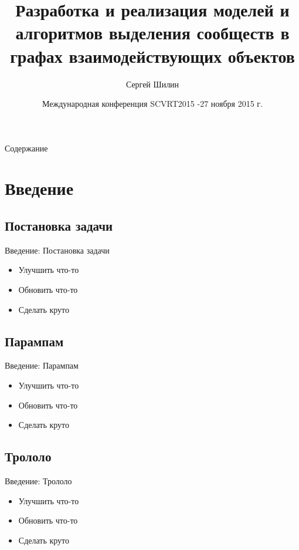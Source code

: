 \documentclass[11pt,pdf,hyperref={unicode}]{beamer}
\title[Выделение сообществ в графах \hspace*{1cm} SCVRT2015]{Разработка и реализация моделей и алгоритмов выделения сообществ в графах взаимодействующих объектов}
\author[C. Шилин]{Сергей Шилин \vspace{-0.7cm}}
\date[SCVRT2015]{Международная конференция SCVRT2015 \break 24-27 ноября 2015 г. }
\begin{document}
\frame{\titlepage}
\begin{frame}{Содержание}
	\tableofcontents
\end{frame}

\section{Введение} %
\label{sec:intro}

	\subsection{Постановка задачи} %
	\label{sub:problem}
		\begin{frame}{Введение: Постановка задачи} 
			\begin{itemize}
				\item Улучшить что-то
				\pause \item Обновить что-то
				\pause \item Сделать круто
			\end{itemize}
		\end{frame}

	\subsection{Парампам} %
	\label{sub:params}
		\begin{frame}{Введение: Парампам}
			\begin{itemize}
				\item Улучшить что-то
				\pause \item Обновить что-то
				\pause \item Сделать круто
			\end{itemize}
		\end{frame}
	

	\subsection{Трололо} %
	\label{sub:trololo}
		\begin{frame}{Введение: Трололо}
			\begin{itemize}
				\item Улучшить что-то
				\pause \item Обновить что-то
				\pause \item Сделать круто
			\end{itemize}
		\end{frame}
	
\end{document}

